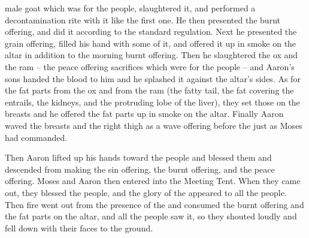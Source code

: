 {male goat
which
was for the people,
slaughtered
it, and performed a decontamination
rite with it like the first one.
He then presented
the burnt offering,
and did
it according to the standard regulation.
Next he presented
the grain offering,
filled
his hand
with some
of it, and offered it up in smoke
on
the altar
in addition
to the morning
burnt offering.
Then he slaughtered
the
ox
and the
ram
– the peace offering
sacrifices
which
were for the people
– and Aaron’s
sons
handed
the blood
to him
and he splashed
it against
the altar’s
sides.
As for the
fat
parts from
the ox
and from
the ram
(the fatty tail,
the fat covering
the entrails, the kidneys,
and the protruding lobe
of the liver),
they set
those
on
the breasts
and he offered the fat
parts up in smoke
on the altar.
Finally Aaron
waved
the breasts
and the right
thigh
as a wave offering
before
the
{}
just
as Moses
had commanded.
\par }{\PP {}Then Aaron
lifted
up his hands
toward
the people
and blessed
them and descended
from making
the sin offering,
the burnt offering,
and the peace offering.
Moses
and Aaron
then entered
into
the Meeting
Tent.
When they came out,
they blessed
the
people,
and the glory
of the {}
appeared
to
all
the people.
Then fire
went out
from the presence
of the {}
and consumed
the
burnt offering
and the
fat
parts on
the altar,
and all
the people
saw
it, so they shouted
loudly and fell
down with their faces to the ground.

}
